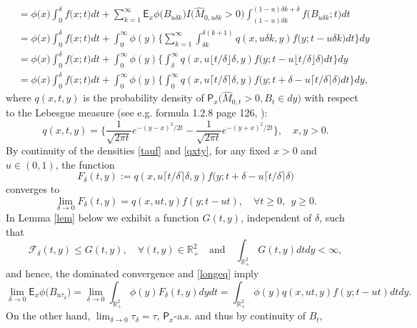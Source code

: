 \documentclass[reqno,10pt]{amsart}
\theoremstyle{definition}
\theoremstyle{remark}
\numberwithin{equation}{section}
\begin{document}
\begin{align}\label{longeq}
&=\phi\big(x\big)\int_{0}^{\delta } f\big(x;t\big)dt+
\sum_{k= 1}^\infty {\mathsf{E}}_x \phi\big(B_{u\delta k}\big)
I\Big(\hat M_{0,u\delta k}>0\Big)\int_{(1-u)\delta k}^{(1-u)\delta k + \delta} f\big(B_{u\delta k};t\big)dt
\nonumber
\\
&=\phi\big(x\big)\int_{0}^{\delta } f\big(x;t\big)dt+
\int_0^\infty\phi(y) \bigg\{\sum_{k= 1}^\infty\int_{\delta k}^{\delta (k+1)} q(x,u\delta k,y) f\big(y;t-u\delta k\big)dt\bigg\}dy
\nonumber
\\
&=\phi\big(x\big)\int_{0}^{\delta } f\big(x;t\big)dt+
\int_0^\infty\phi(y)\bigg\{ \int_{\delta}^{\infty} q(x,u \lfloor t/\delta\rfloor \delta,y) f\big(y;t-u\lfloor t/\delta\rfloor \delta\big)dt\bigg\}dy
\nonumber
\\
&=\phi\big(x\big)\int_{0}^{\delta } f\big(x;t\big)dt+
\int_0^\infty\phi(y)\bigg\{ \int_{0}^{\infty} q(x,u \lceil t/\delta\rceil\delta,y) f\big(y;t+\delta-u\lceil t/\delta\rceil\delta\big)dt\bigg\}dy,
\end{align}
where $q(x,t,y)$ is the probability density of ${\mathsf{P}}_x\big(\hat M_{0,t}>0,B_t\in dy \big)$ with respect to the
Lebesgue measure (see e.g. formula 1.2.8 page 126, \cite{BoSa96}):
\begin{equation}
\label{qxty}
q(x,t,y)=
\bigg\{
\frac{1}{\sqrt{2\pi t}}e^{-(y-x)^2/2t}-\frac{1}{\sqrt{2\pi t}}e^{-(y+x)^2/2t}\bigg\},
\quad x,y>0.
\end{equation}
By continuity of the densities \eqref{tauf} and \eqref{qxty}, for any fixed $x>0$ and $u\in(0,1)$, the function
$$
F_\delta(t,y):=q(x,u \lceil t/\delta\rceil\delta,y) f\big(y;t+\delta-u\lceil t/\delta\rceil\delta\big)
$$
converges to
$$
\lim_{\delta \to 0}F_\delta(t,y)=q(x,u t,y) f(y;t-ut), \quad \forall t\ge  0,\ \ y\ge 0.
$$
In  Lemma \ref{lem} below we exhibit a function $G(t,y)$, independent of $\delta$,
such that
\begin{equation}\label{domdom}
{\mathcal{F}}_\delta(t,y)\le G(t,y), \quad \forall (t,y)\in {\mathbb R}^2_+\quad \text{and}\quad
\int_{{\mathbb R}^2_+} G(t,y)dtdy<\infty,
\end{equation}
and hence, the dominated convergence and \eqref{longeq} imply
\begin{equation}\label{dc}
\lim_{\delta \to 0}{\mathsf{E}}_x \phi\big(B_{u\tau_\delta}\big) =
\lim_{\delta\to 0}\int_{{\mathbb R}^2_+}\phi(y)F_\delta(t,y)dydt =
\int_{{\mathbb R}^2_+}\phi(y) q(x,u t,y) f(y;t-ut)dtdy.
\end{equation}
On the other hand,  $\lim_{\delta\to 0}\tau_\delta= \tau$, ${\mathsf{P}}_x$-a.s. and thus  by continuity of $B_t$,
\end{document}
